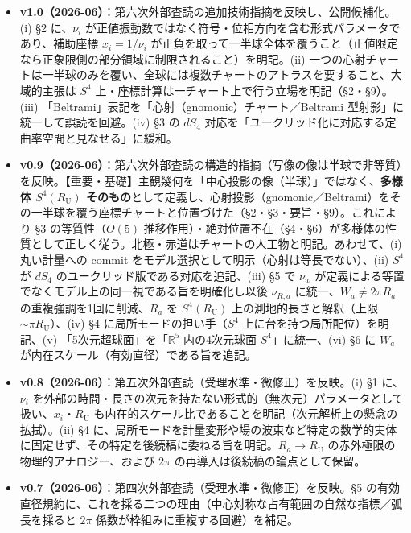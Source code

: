 \documentclass[
]{ltjsarticle}
\providecommand{\tightlist}{%
  \setlength{\itemsep}{0pt}\setlength{\parskip}{0pt}}
\begin{document}
\begin{itemize}
\tightlist
\item
  \textbf{v1.0（2026-06）}：第六次外部査読の追加技術指摘を反映し、公開候補化。(i)
  §2 に、\(\nu_i\)
  が正値振動数ではなく符号・位相方向を含む形式パラメータであり、補助座標
  \(x_i=1/\nu_i\)
  が正負を取って一半球全体を覆うこと（正値限定なら正象限側の部分領域に制限されること）を明記。(ii)
  一つの心射チャートは一半球のみを覆い、全球には複数チャートのアトラスを要すること、大域的主張は
  \(S^4\) 上・座標計算は一チャート上で行う立場を明記（§2・§9）。(iii)
  「Beltrami」表記を「心射（gnomonic）チャート／Beltrami
  型射影」に統一して誤読を回避。(iv) §3 の \(dS_4\)
  対応を「ユークリッド化に対応する定曲率空間と見なせる」に緩和。
\item
  \textbf{v0.9（2026-06）}：第六次外部査読の構造的指摘（写像の像は半球で非等質）を反映。【重要・基礎】主観幾何を「中心投影の像（半球）」ではなく、\textbf{多様体
  \(S^4(R_{\mathrm U})\)
  そのもの}として定義し、心射投影（gnomonic／Beltrami）をその一半球を覆う座標チャートと位置づけた（§2・§3・要旨・§9）。これにより
  §3 の等質性（\(O(5)\)
  推移作用）・絶対位置不在（§4・§6）が多様体の性質として正しく従う。北極・赤道はチャートの人工物と明記。あわせて、(i)
  丸い計量への commit をモデル選択として明示（心射は等長でない）、(ii)
  \(S^4\) が \(dS_4\) のユークリッド版である対応を追記、(iii) §5 で
  \(\nu_w\) が定義による等置でなくモデル上の同一視である旨を明確化し以後
  \(\nu_{R,a}\) に統一、\(W_a\neq2\pi R_a\)
  の重複強調を1回に削減、\(R_a\) を \(S^4(R_{\mathrm U})\)
  上の測地的長さと解釈（上限 \(\sim\pi R_{\mathrm U}\)）、(iv) §4
  に局所モードの担い手（\(S^4\) 上に台を持つ局所配位）を明記、(v)
  「5次元超球面」を「\(\mathbb{R}^5\) 内の4次元球面
  \(S^4\)」に統一、(vi) §6 に \(W_a\)
  が内在スケール（有効直径）である旨を追記。
\item
  \textbf{v0.8（2026-06）}：第五次外部査読（受理水準・微修正）を反映。(i)
  §1 に、\(\nu_i\)
  を外部の時間・長さの次元を持たない形式的（無次元）パラメータとして扱い、\(x_i\)・\(R_{\mathrm U}\)
  も内在的スケール比であることを明記（次元解析上の懸念の払拭）。(ii) §4
  に、局所モードを計量変形や場の波束など特定の数学的実体に固定せず、その特定を後続稿に委ねる旨を明記。\(R_a\to R_{\mathrm U}\)
  の赤外極限の物理的アナロジー、および \(2\pi\)
  の再導入は後続稿の論点として保留。
\item
  \textbf{v0.7（2026-06）}：第四次外部査読（受理水準・微修正）を反映。§5
  の有効直径規約に、これを採る二つの理由（中心対称な占有範囲の自然な指標／弧長を採ると
  \(2\pi\) 係数が枠組みに重複する回避）を補足。

\end{itemize}
\end{document}

